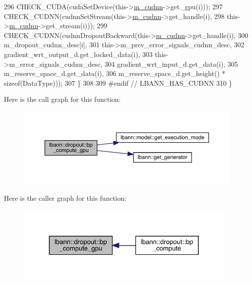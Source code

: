 \begin{DoxyCode}
296       CHECK\_CUDA(cudaSetDevice(this->\hyperlink{classlbann_1_1Layer_a08dbb94239e3b8c96329786c57c72e21}{m\_cudnn}->get\_gpu(i)));
297       CHECK\_CUDNN(cudnnSetStream(this->\hyperlink{classlbann_1_1Layer_a08dbb94239e3b8c96329786c57c72e21}{m\_cudnn}->get\_handle(i),
298                                  this->\hyperlink{classlbann_1_1Layer_a08dbb94239e3b8c96329786c57c72e21}{m\_cudnn}->get\_stream(i)));
299       CHECK\_CUDNN(cudnnDropoutBackward(this->\hyperlink{classlbann_1_1Layer_a08dbb94239e3b8c96329786c57c72e21}{m\_cudnn}->get\_handle(i),
300                                        m\_dropout\_cudnn\_desc[i],
301                                        this->m\_prev\_error\_signals\_cudnn\_desc,
302                                        gradient\_wrt\_output\_d.get\_locked\_data(i),
303                                        this->m\_error\_signals\_cudnn\_desc,
304                                        gradient\_wrt\_input\_d.get\_data(i),
305                                        m\_reserve\_space\_d.get\_data(i),
306                                        m\_reserve\_space\_d.get\_height() * \textcolor{keyword}{sizeof}(DataType)));
307     \}
308 
309 \textcolor{preprocessor}{  #endif // LBANN\_HAS\_CUDNN}
310   \}
\end{DoxyCode}
Here is the call graph for this function\+:\nopagebreak
\begin{figure}[H]
\begin{center}
\leavevmode
\includegraphics[width=350pt]{classlbann_1_1dropout_aeafadecbcfc81734d0c1850b4004dcc3_cgraph}
\end{center}
\end{figure}
Here is the caller graph for this function\+:\nopagebreak
\begin{figure}[H]
\begin{center}
\leavevmode
\includegraphics[width=309pt]{classlbann_1_1dropout_aeafadecbcfc81734d0c1850b4004dcc3_icgraph}
\end{center}
\end{figure}
\mbox{\label{classlbann_1_1dropout_a0e6e50b50f8c2620315f3257bbab41b3}} 
